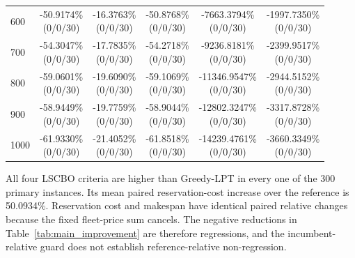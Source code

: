 \begin{table}[!htbp]
{\begin{tabular}{l c c c c c}
600 & \shortstack{-50.9174\%\\(0/0/30)} & \shortstack{-16.3763\%\\(0/0/30)} & \shortstack{-50.8768\%\\(0/0/30)} & \shortstack{-7663.3794\%\\(0/0/30)} & \shortstack{-1997.7350\%\\(0/0/30)} \\
700 & \shortstack{-54.3047\%\\(0/0/30)} & \shortstack{-17.7835\%\\(0/0/30)} & \shortstack{-54.2718\%\\(0/0/30)} & \shortstack{-9236.8181\%\\(0/0/30)} & \shortstack{-2399.9517\%\\(0/0/30)} \\
800 & \shortstack{-59.0601\%\\(0/0/30)} & \shortstack{-19.6090\%\\(0/0/30)} & \shortstack{-59.1069\%\\(0/0/30)} & \shortstack{-11346.9547\%\\(0/0/30)} & \shortstack{-2944.5152\%\\(0/0/30)} \\
900 & \shortstack{-58.9449\%\\(0/0/30)} & \shortstack{-19.7759\%\\(0/0/30)} & \shortstack{-58.9044\%\\(0/0/30)} & \shortstack{-12802.3247\%\\(0/0/30)} & \shortstack{-3317.8728\%\\(0/0/30)} \\
1000 & \shortstack{-61.9330\%\\(0/0/30)} & \shortstack{-21.4052\%\\(0/0/30)} & \shortstack{-61.8518\%\\(0/0/30)} & \shortstack{-14239.4761\%\\(0/0/30)} & \shortstack{-3660.3349\%\\(0/0/30)} \\
\bottomrule
\end{tabular}
}
\end{table}

\FloatBarrier
All four LSCBO criteria are higher than Greedy-LPT in every one of the 300 primary instances. Its mean paired reservation-cost increase over the reference is 50.0934\%. Reservation cost and makespan have identical paired relative changes because the fixed fleet-price sum cancels. The negative reductions in Table~\ref{tab:main_improvement} are therefore regressions, and the incumbent-relative guard does not establish reference-relative non-regression.

